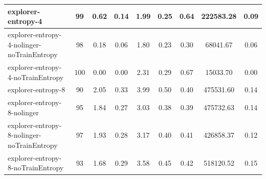 \begin{table}
\begin{longtable}{|l|c|c|c|c|c|c|c|c|}
    
        explorer-entropy-4 & 99 & {\cellcolor[HTML]{C4E0DA}} \color[HTML]{000000} 0.62 & {\cellcolor[HTML]{E2EEEB}} \color[HTML]{000000} 0.14 & {\cellcolor[HTML]{C8E1DC}} \color[HTML]{000000} 1.99 & {\cellcolor[HTML]{D5E8E4}} \color[HTML]{000000} 0.25 & 0.64 & 222583.28 & {\cellcolor[HTML]{EBF2F0}} \color[HTML]{000000} 0.09 \\ \hline
        explorer-entropy-4-nolinger-noTrainEntropy & 98 & {\cellcolor[HTML]{E7F0EE}} \color[HTML]{000000} 0.18 & {\cellcolor[HTML]{EBF2F0}} \color[HTML]{000000} 0.06 & {\cellcolor[HTML]{CBE3DE}} \color[HTML]{000000} 1.80 & {\cellcolor[HTML]{D9EAE6}} \color[HTML]{000000} 0.23 & 0.30 & 68041.67 & {\cellcolor[HTML]{EBF2F0}} \color[HTML]{000000} 0.06 \\ \hline
        explorer-entropy-4-noTrainEntropy & 100 & {\cellcolor[HTML]{EBF2F0}} \color[HTML]{000000} 0.00 & {\cellcolor[HTML]{EBF2F0}} \color[HTML]{000000} 0.00 & {\cellcolor[HTML]{C1DED8}} \color[HTML]{000000} 2.31 & {\cellcolor[HTML]{CFE5E0}} \color[HTML]{000000} 0.29 & 0.67 & 15033.70 & {\cellcolor[HTML]{EBF2F0}} \color[HTML]{000000} 0.00 \\ \hline
        explorer-entropy-8 & 90 & {\cellcolor[HTML]{55AA99}} \color[HTML]{F1F1F1} 2.05 & {\cellcolor[HTML]{6BB4A6}} \color[HTML]{F1F1F1} 0.33 & {\cellcolor[HTML]{A2CFC6}} \color[HTML]{000000} 3.99 & {\cellcolor[HTML]{AAD3CB}} \color[HTML]{000000} 0.50 & 0.40 & 475531.60 & {\cellcolor[HTML]{A4D0C7}} \color[HTML]{000000} 0.14 \\ \hline
        explorer-entropy-8-nolinger & 95 & {\cellcolor[HTML]{65B2A2}} \color[HTML]{F1F1F1} 1.84 & {\cellcolor[HTML]{93C8BD}} \color[HTML]{000000} 0.27 & {\cellcolor[HTML]{B4D8D0}} \color[HTML]{000000} 3.03 & {\cellcolor[HTML]{BFDDD7}} \color[HTML]{000000} 0.38 & 0.39 & 475732.63 & {\cellcolor[HTML]{A9D2CA}} \color[HTML]{000000} 0.14 \\ \hline
        explorer-entropy-8-nolinger-noTrainEntropy & 97 & {\cellcolor[HTML]{5EAF9E}} \color[HTML]{F1F1F1} 1.93 & {\cellcolor[HTML]{8CC4B9}} \color[HTML]{000000} 0.28 & {\cellcolor[HTML]{B1D6CE}} \color[HTML]{000000} 3.17 & {\cellcolor[HTML]{BCDCD5}} \color[HTML]{000000} 0.40 & 0.41 & 426858.37 & {\cellcolor[HTML]{EBF2F0}} \color[HTML]{000000} 0.12 \\ \hline
        explorer-entropy-8-noTrainEntropy & 93 & {\cellcolor[HTML]{71B8A9}} \color[HTML]{F1F1F1} 1.68 & {\cellcolor[HTML]{85C1B5}} \color[HTML]{000000} 0.29 & {\cellcolor[HTML]{A9D2CA}} \color[HTML]{000000} 3.58 & {\cellcolor[HTML]{B3D7D0}} \color[HTML]{000000} 0.45 & 0.42 & 518120.52 & {\cellcolor[HTML]{6FB7A8}} \color[HTML]{F1F1F1} 0.15 \\ \hline

\end{longtable}
\end{table}
